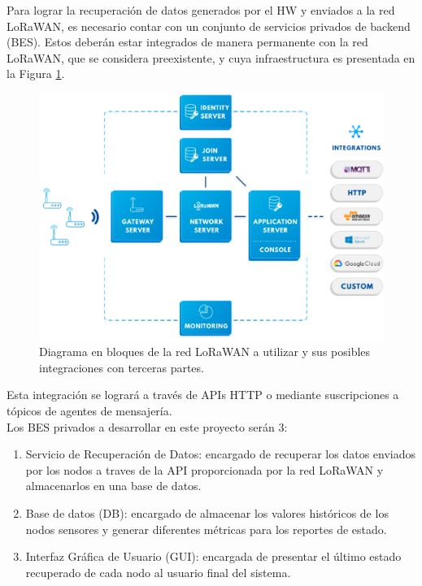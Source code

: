 \documentclass[11pt]{charter}
\begin{document}
Para lograr la recuperación de datos generados por el HW y enviados a la red LoRaWAN, es necesario contar con un conjunto de servicios privados de backend (BES). Estos deberán estar integrados de manera permanente con la red LoRaWAN, que se considera preexistente, y cuya infraestructura es presentada en la Figura \ref{fig:diagBloquesLoRaWAN}.\\

\begin{figure}[H]
	\centering 
	\includegraphics[width=\textwidth]{./Figuras/arquitectura_TTN.png}
	\caption{Diagrama en bloques de la red LoRaWAN a utilizar y sus posibles integraciones con terceras partes.}
	\label{fig:diagBloquesLoRaWAN}
\end{figure}

Esta integración se logrará a través de APIs HTTP o mediante suscripciones a tópicos de agentes de mensajería.\\
Los BES privados a desarrollar en este proyecto serán 3:
\begin{enumerate}
	\item Servicio de Recuperación de Datos: encargado de recuperar los datos enviados por los nodos a traves de la API proporcionada por la red LoRaWAN y almacenarlos en una base de datos.
	\item Base de datos (DB): encargado de almacenar los valores históricos de los nodos sensores y generar diferentes métricas para los reportes de estado.
	\item Interfaz Gráfica de Usuario (GUI): encargada de presentar el último estado recuperado de cada nodo al usuario final del sistema.
\end{enumerate}
\end{document}
